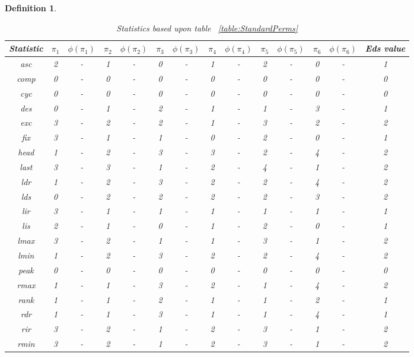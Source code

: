 \documentclass[12pt]{article}
\newtheorem{definition}{Definition}
\begin{document}
\begin{definition}
\begin{table}[H]
\caption{Statistics based upon table ~\ref{table:StandardPerms}}
\centering
\tabcolsep=0.11cm
\begin{tabular}{c | c c c c c c c c c c c c | c}
\hline\hline
Statistic & $\pi_1$ & $\phi(\pi_1)$ & $\pi_2$ & $\phi(\pi_2)$ & $\pi_3$ & $\phi(\pi_3)$ & $\pi_4$ & $\phi(\pi_4)$ & $\pi_5$ & $\phi(\pi_5)$ & $\pi_6$ & $\phi(\pi_6)$ & Eds value\\ [0.5ex]
\hline
asc & 2 & - & 1 & - & 0 & - & 1 & - & 2 & - & 0 & - & 1\\ 
comp & 0 & - & 0 & - & 0 & - & 0 & - & 0 & - & 0 & - & 0\\
cyc & 0 & - & 0 & - & 0 & - & 0 & - & 0 & - & 0 & - & 0\\
des & 0 & - & 1 & - & 2 & - & 1 & - & 1 & - & 3 & - & 1\\
exc & 3 & - & 2 & - & 2 & - & 1 & - & 3 & - & 2 & - & 2\\
fix & 3 & - & 1 & - & 1 & - & 0 & - & 2 & - & 0 & - & 1\\
head & 1 & - & 2 & - & 3 & - & 3 & - & 2 & - & 4 & - & 2\\
last & 3 & - & 3 & - & 1 & - & 2 & - & 4 & - & 1 & - & 2\\
ldr & 1 & - & 2 & - & 3 & - & 2 & - & 2 & - & 4 & - & 2\\
lds & 0 & - & 2 & - & 2 & - & 2 & - & 2 & - & 3 & - & 2\\
lir & 3 & - & 1 & - & 1 & - & 1 & - & 1 & - & 1 & - & 1\\
lis & 2 & - & 1 & - & 0 & - & 1 & - & 2 & - & 0 & - & 1\\
lmax & 3 & - & 2 & - & 1 & - & 1 & - & 3 & - & 1 & - & 2\\
lmin & 1 & - & 2 & - & 3 & - & 2 & - & 2 & - & 4 & - & 2\\
peak & 0 & - & 0 & - & 0 & - & 0 & - & 0 & - & 0 & - & 0\\
rmax & 1 & - & 1 & - & 3 & - & 2 & - & 1 & - & 4 & - & 2\\
rank & 1 & - & 1 & - & 2 & - & 1 & - & 1 & - & 2 & - & 1\\
rdr & 1 & - & 1 & - & 3 & - & 1 & - & 1 & - & 4 & - & 1\\
rir & 3 & - & 2 & - & 1 & - & 2 & - & 3 & - & 1 & - & 2\\
rmin & 3 & - & 2 & - & 1 & - & 2 & - & 3 & - & 1 & - & 2\\

\end{tabular}
\end{table}
\end{definition}
\end{document}
